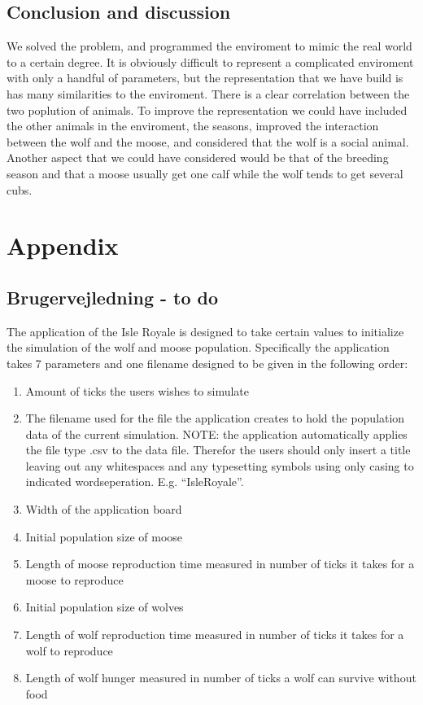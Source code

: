 \documentclass[a4paper]{report}
\begin{document}
\subsection*{Conclusion and discussion}
We solved the problem, and programmed the enviroment to mimic the real world to a certain degree. It is obviously difficult to represent a complicated enviroment with only a handful of parameters, but the representation that we have build is has many similarities to the enviroment. There is a clear correlation between the two poplution of animals.
To improve the representation we could have included the other animals in the enviroment, the seasons, improved the interaction between the wolf and the moose, and considered that the wolf is a social animal. Another aspect that we could have considered would be that of the breeding season and that a moose usually get one calf while the wolf tends to get several cubs.

\newpage
\section*{Appendix}

\subsection*{Brugervejledning - to do}
The application of the Isle Royale is designed to take certain values to initialize the simulation of the wolf and moose population. Specifically the application takes 7 parameters and one filename designed to be given in the following order:
\begin{enumerate}
\item Amount of ticks the users wishes to simulate
\item The filename used for the file the application creates to hold the population data of the current simulation. NOTE: the application automatically applies the file type .csv to the data file. Therefor the users should only insert a title leaving out any whitespaces and any typesetting symbols using only casing to indicated wordseperation. E.g. “IsleRoyale”.
\item Width of the application board
\item Initial population size of moose
\item Length of moose reproduction time measured in number of ticks it takes for a moose to reproduce
\item Initial population size of wolves
\item Length of wolf reproduction time measured in number of ticks it takes for a wolf to reproduce
\item Length of wolf hunger measured in number of ticks a wolf can survive without food
\end{enumerate}
\end{document}
